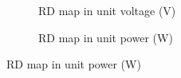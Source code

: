 \documentclass[12pt,DIV14,BCOR12mm,a4paper,footinclude=false,headinclude,parskip=half-,twoside,openright,cleardoublepage=empty,toc=index,bibliography=totoc,listof=totoc]{scrreprt}
\numberwithin{equation}{chapter}
\begin{document}
\begin{figure}[t]
    \centering
    \begin{subfigure}{0.45\textwidth}
        \centering
        \caption{RD map in unit voltage (V)}
        \label{1r_empty_V}
    \end{subfigure}\hspace{0.5cm}
    \begin{subfigure}{0.45\textwidth}
        \centering
        \caption{RD map in unit power (W)}
        \label{1r_empty_W}
    \end{subfigure}

\end{figure}
\end{document}
